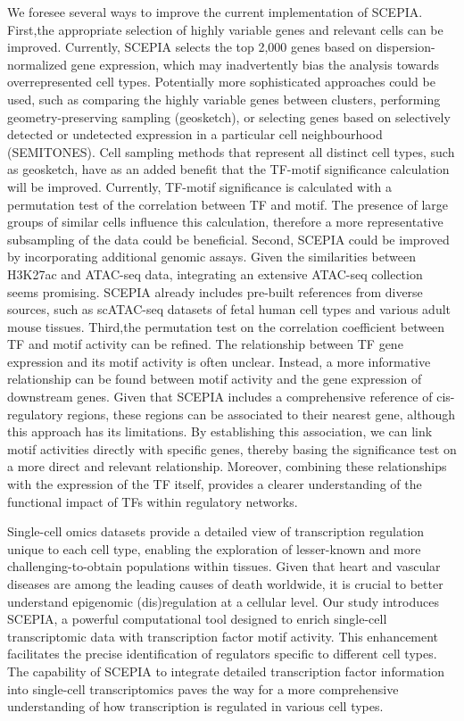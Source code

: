 We foresee several ways to improve the current implementation of SCEPIA. First,the appropriate selection of highly variable genes and relevant cells can be improved. Currently, SCEPIA selects the top 2,000 genes based on dispersion-normalized gene expression, which may inadvertently bias the analysis towards overrepresented cell types. Potentially more sophisticated approaches could be used, such as comparing the highly variable genes between clusters, performing geometry-preserving sampling (geosketch)\cite{Hie2019}, or selecting genes based on selectively detected or undetected expression in a particular cell neighbourhood (SEMITONES)\cite{Vlot2022}. Cell sampling methods that represent all distinct cell types, such as geosketch, have as an added benefit that the TF-motif significance calculation will be improved. Currently, TF-motif significance is calculated with a permutation test of the correlation between TF and motif. The presence of large groups of similar cells influence this calculation, therefore a more representative subsampling of the data could be beneficial. Second, SCEPIA could be improved by incorporating additional genomic assays. Given the similarities between H3K27ac and ATAC-seq data, integrating an extensive ATAC-seq collection seems promising. SCEPIA already includes pre-built references from diverse sources, such as scATAC-seq datasets of fetal human cell types\cite{Domcke2020} and various adult mouse tissues\cite{Cusanovich2018}. Third,the permutation test on the correlation coefficient between TF and motif activity can be refined. The relationship between TF gene expression and its motif activity is often unclear. Instead, a more informative relationship can be found between motif activity and the gene expression of downstream genes. Given that SCEPIA includes a comprehensive reference of cis-regulatory regions, these regions can be associated to their nearest gene, although this approach has its limitations\cite{Fulco_2019}. By establishing this association, we can link motif activities directly with specific genes, thereby basing the significance test on a more direct and relevant relationship. Moreover, combining these relationships with the expression of the TF itself, provides a clearer understanding of the functional impact of TFs within regulatory networks.

Single-cell omics datasets provide a detailed view of transcription regulation unique to each cell type, enabling the exploration of lesser-known and more challenging-to-obtain populations within tissues. Given that heart and vascular diseases are among the leading causes of death worldwide\cite{Tsao2023}, it is crucial to better understand epigenomic (dis)regulation at a cellular level. Our study introduces SCEPIA, a powerful computational tool designed to enrich single-cell transcriptomic data with transcription factor motif activity. This enhancement facilitates the precise identification of regulators specific to different cell types. The capability of SCEPIA to integrate detailed transcription factor information into single-cell transcriptomics paves the way for a more comprehensive understanding of how transcription is regulated in various cell types.

